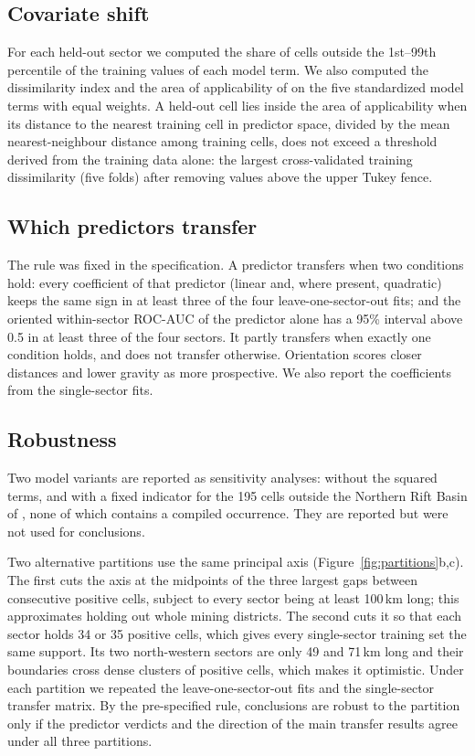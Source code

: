 \documentclass[pdflatex,sn-basic]{sn-jnl}%
\begin{document}
\subsection{Covariate shift}
\label{sec:shift-methods}

For each held-out sector we computed the share of cells outside the 1st--99th percentile of the training values of each model term. We also computed the dissimilarity index and the area of applicability of \citet{Meyer2021} on the five standardized model terms with equal weights. A held-out cell lies inside the area of applicability when its distance to the nearest training cell in predictor space, divided by the mean nearest-neighbour distance among training cells, does not exceed a threshold derived from the training data alone: the largest cross-validated training dissimilarity (five folds) after removing values above the upper Tukey fence.

\subsection{Which predictors transfer}
\label{sec:predictor-rule}

The rule was fixed in the specification. A predictor transfers when two conditions hold: every coefficient of that predictor (linear and, where present, quadratic) keeps the same sign in at least three of the four leave-one-sector-out fits; and the oriented within-sector ROC-AUC of the predictor alone has a 95\% interval above 0.5 in at least three of the four sectors. It partly transfers when exactly one condition holds, and does not transfer otherwise. Orientation scores closer distances and lower gravity as more prospective. We also report the coefficients from the single-sector fits.

\subsection{Robustness}
\label{sec:robustness-methods}

Two model variants are reported as sensitivity analyses: without the squared terms, and with a fixed indicator for the 195 cells outside the Northern Rift Basin of \citet{Daly2025}, none of which contains a compiled occurrence. They are reported but were not used for conclusions.

Two alternative partitions use the same principal axis (Figure~\ref{fig:partitions}b,c). The first cuts the axis at the midpoints of the three largest gaps between consecutive positive cells, subject to every sector being at least 100\,km long; this approximates holding out whole mining districts. The second cuts it so that each sector holds 34 or 35 positive cells, which gives every single-sector training set the same support. Its two north-western sectors are only 49 and 71\,km long and their boundaries cross dense clusters of positive cells, which makes it optimistic. Under each partition we repeated the leave-one-sector-out fits and the single-sector transfer matrix. By the pre-specified rule, conclusions are robust to the partition only if the predictor verdicts and the direction of the main transfer results agree under all three partitions.
\end{document}
